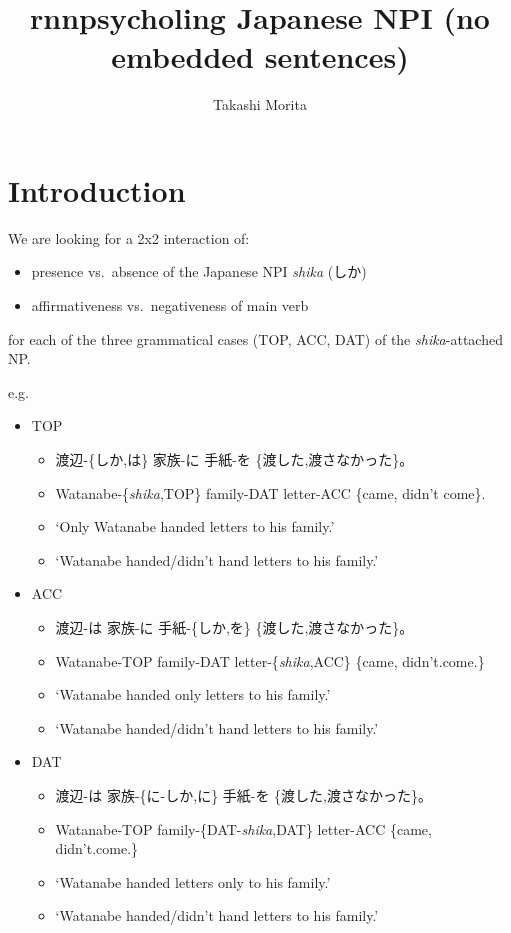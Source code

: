\documentclass[]{ltjsarticle}
\title{rnnpsycholing Japanese NPI (no embedded sentences)}
\author{Takashi Morita}
\date{}
\providecommand{\tightlist}{%
  \setlength{\itemsep}{0pt}\setlength{\parskip}{0pt}}
\begin{document}
\maketitle

{
\setcounter{tocdepth}{3}
\tableofcontents
}
\section{Introduction}\label{introduction}

We are looking for a 2x2 interaction of:

\begin{itemize}
\tightlist
\item
  presence vs.~absence of the Japanese NPI \emph{shika} (しか)
\item
  affirmativeness vs.~negativeness of main verb
\end{itemize}

for each of the three grammatical cases (TOP, ACC, DAT) of the
\emph{shika}-attached NP.

e.g.

\begin{itemize}
\tightlist
\item
  TOP

  \begin{itemize}
  \tightlist
  \item
    渡辺-\{しか,は\} 家族-に 手紙-を \{渡した,渡さなかった\}。
  \item
    Watanabe-\{\emph{shika},TOP\} family-DAT letter-ACC \{came, didn't
    come\}.
  \item
    `Only Watanabe handed letters to his family.'
  \item
    `Watanabe handed/didn't hand letters to his family.'
  \end{itemize}
\item
  ACC

  \begin{itemize}
  \tightlist
  \item
    渡辺-は 家族-に 手紙-\{しか,を\} \{渡した,渡さなかった\}。
  \item
    Watanabe-TOP family-DAT letter-\{\emph{shika},ACC\} \{came,
    didn't.come.\}
  \item
    `Watanabe handed only letters to his family.'
  \item
    `Watanabe handed/didn't hand letters to his family.'
  \end{itemize}
\item
  DAT

  \begin{itemize}
  \tightlist
  \item
    渡辺-は 家族-\{に-しか,に\} 手紙-を \{渡した,渡さなかった\}。
  \item
    Watanabe-TOP family-\{DAT-\emph{shika},DAT\} letter-ACC \{came,
    didn't.come.\}
  \item
    `Watanabe handed letters only to his family.'
  \item
    `Watanabe handed/didn't hand letters to his family.'
  \end{itemize}
\end{itemize}
\end{document}
